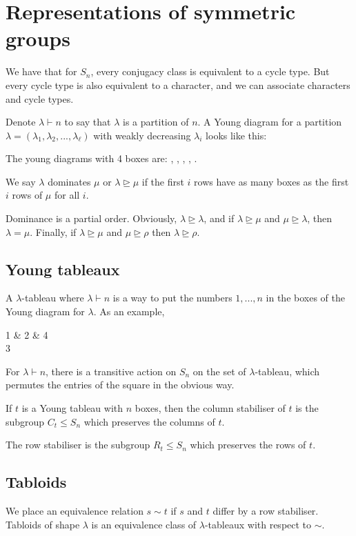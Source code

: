 \documentclass[]{report}
\theoremstyle{definition}
\numberwithin{theorem}{section}
\numberwithin{equation}{section}
\begin{document}
\section{Representations of symmetric groups}

We have that for $S_n$, every conjugacy class is equivalent to a cycle type. But every cycle type is also equivalent to a character, and we can associate characters and cycle types.

Denote $\lambda \vdash n$ to say that $\lambda$ is a partition of $n$. 
A Young diagram for a partition $\lambda = (\lambda_1, \lambda_2, ..., \lambda_\ell)$ with weakly decreasing $\lambda_i$ looks like this:


The young diagrams with 4 boxes are:
, , , ,  .

We say $\lambda$ dominates $\mu$ or $\lambda \unrhd \mu$ if the first $i$ rows have as many boxes as the first $i$ rows of $\mu$ for all $i$. 

Dominance is a partial order. Obviously, $\lambda \unrhd \lambda$, and if $\lambda \unrhd \mu$ and $\mu \unrhd \lambda$, then $\lambda = \mu$. Finally, if $\lambda \unrhd \mu$ and $\mu \unrhd \rho$ then $\lambda \unrhd \rho$. 

\subsection{Young tableaux}
A $\lambda$-tableau where $\lambda \vdash n$ is a way to put the numbers $ 1, ..., n$ in the boxes of the Young diagram for $\lambda$. As an example,
\begin{ytableau}
	1 & 2 & 4\\
	3
\end{ytableau}

For $\lambda \vdash n$, there is a transitive action on $S_n$ on the set of $\lambda$-tableau, which permutes the entries of the square in the obvious way. 

If $t$ is a Young tableau with $n$ boxes, then the column stabiliser of $t$ is the subgroup $C_t \leq S_n$ which preserves the columns of $t$. 

The row stabiliser is the subgroup $R_t \leq S_n$ which preserves the rows of $t$. 

\subsection{Tabloids}
We place an equivalence relation $s \sim t$ if $s$ and $t$ differ by a row stabiliser. Tabloids of shape $\lambda$ is an equivalence class of $\lambda$-tableaux with respect to $\sim$. 
\end{document}
